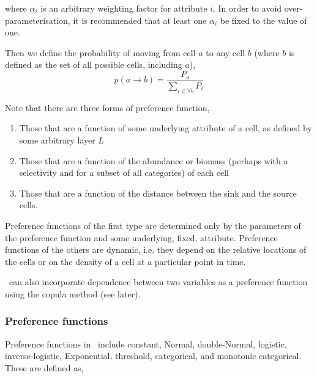 where $\alpha_i$ is an arbitrary weighting factor for attribute $i$. In order to avoid over-parameterisation, it is recommended that at least one $\alpha_i$ be fixed to the value of one.

Then we define the probability of moving from cell $a$ to any cell $b$ (where $b$ is defined as the set of all possible cells, including $a$),
\begin{equation}
  p(a\rightarrow b) = \frac{P_a}{\sum\limits_{i \in \forall b} P_i}
\end{equation}

Note that there are three forms of preference function,
\begin{enumerate}
\item Those that are a function of some underlying attribute of a cell, as defined by some arbitrary layer $L$
\item Those that are a function of the abundance or biomass (perhaps with a selectivity and for a subset of all categories) of each cell
\item Those that are a function of the distance between the sink and the source cells. 
\end{enumerate} 

Preference functions of the first type are determined only by the parameters of the preference function and some underlying, fixed, attribute. Preference functions of the others are dynamic, i.e. they depend on the relative locations of the cells or on the density of a cell at a particular point in time.

\SPM\ can also incorporate dependence between two variables as a preference function using the copula method (see later).

\subsubsection*{Preference functions}

Preference functions in \SPM\ include constant, Normal, double-Normal, logistic, inverse-logistic, Exponential, threshold, categorical, and monotonic categorical. These are defined as,

